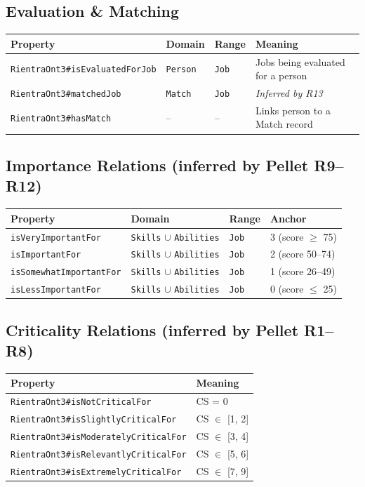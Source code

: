 ﻿\documentclass[12pt,a4paper]{article}
\begin{document}
\subsection{Evaluation \& Matching}
\begin{longtable}{@{}llll@{}}
\toprule
\textbf{Property} & \textbf{Domain} & \textbf{Range} & \textbf{Meaning} \\
\midrule
\endhead
\texttt{RientraOnt3\#isEvaluatedForJob} & \texttt{Person} & \texttt{Job} & Jobs being evaluated for a person \\
\texttt{RientraOnt3\#matchedJob} & \texttt{Match} & \texttt{Job} & \textit{Inferred by R13} \\
\texttt{RientraOnt3\#hasMatch} & -- & -- & Links person to a Match record \\
\bottomrule
\end{longtable}

\subsection{Importance Relations (inferred by Pellet R9--R12)}
\begin{longtable}{@{}llll@{}}
\toprule
\textbf{Property} & \textbf{Domain} & \textbf{Range} & \textbf{Anchor} \\
\midrule
\endhead
\texttt{isVeryImportantFor} & \texttt{Skills} $\cup$ \texttt{Abilities} & \texttt{Job} & 3 (score $\geq$ 75) \\
\texttt{isImportantFor} & \texttt{Skills} $\cup$ \texttt{Abilities} & \texttt{Job} & 2 (score 50--74) \\
\texttt{isSomewhatImportantFor} & \texttt{Skills} $\cup$ \texttt{Abilities} & \texttt{Job} & 1 (score 26--49) \\
\texttt{isLessImportantFor} & \texttt{Skills} $\cup$ \texttt{Abilities} & \texttt{Job} & 0 (score $\leq$ 25) \\
\bottomrule
\end{longtable}

\subsection{Criticality Relations (inferred by Pellet R1--R8)}
\begin{longtable}{@{}ll@{}}
\toprule
\textbf{Property} & \textbf{Meaning} \\
\midrule
\endhead
\texttt{RientraOnt3\#isNotCriticalFor} & CS = 0 \\
\texttt{RientraOnt3\#isSlightlyCriticalFor} & CS $\in$ [1, 2] \\
\texttt{RientraOnt3\#isModeratelyCriticalFor} & CS $\in$ [3, 4] \\
\texttt{RientraOnt3\#isRelevantlyCriticalFor} & CS $\in$ [5, 6] \\
\texttt{RientraOnt3\#isExtremelyCriticalFor} & CS $\in$ [7, 9] \\
\bottomrule
\end{longtable}
\end{document}
